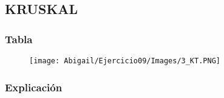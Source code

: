 \documentclass[12pt]{article}
\begin{document}
\newpage

    \subsection{KRUSKAL}
    
      \subsubsection{Tabla}
        \begin{figure}[h!]
          \centering
          \texttt{[image: Abigail/Ejercicio09/Images/3\_KT.PNG]}
        \end{figure} 
        
        \subsubsection{Explicación}
\end{document}
